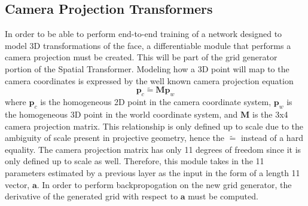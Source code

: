 \documentclass[10pt,twocolumn,letterpaper]{article}
\begin{document}
\subsection{Camera Projection Transformers}
\label{sec:CPT}
In order to be able to perform end-to-end training of a network designed to model 3D transformations of the face, a differentiable module that performs a camera projection must be created. This will be part of the grid generator portion of the Spatial Transformer. Modeling how a 3D point will map to the camera coordinates is expressed by the well known camera projection equation
\begin{equation}
\mathbf{p}_c \widetilde{=} \mathbf{M}\mathbf{p}_w
\label{eqn:proj}
\end{equation}
where $\mathbf{p}_c$ is the homogeneous 2D point in the camera coordinate system, $\mathbf{p}_w$ is the homogeneous 3D point in the world coordinate system, and $\mathbf{M}$ is the 3x4 camera projection matrix. This relationship is only defined up to scale due to the ambiguity of scale present in projective geometry, hence the $\widetilde{=}$ instead of a hard equality. The camera projection matrix has only 11 degrees of freedom since it is only defined up to scale as well. Therefore, this module takes in the 11 parameters estimated by a previous layer as the input in the form of a length 11 vector, $\mathbf{a}$. In order to perform backpropogation on the new grid generator, the derivative of the generated grid with respect to $\mathbf{a}$ must be computed. 
\end{document}
